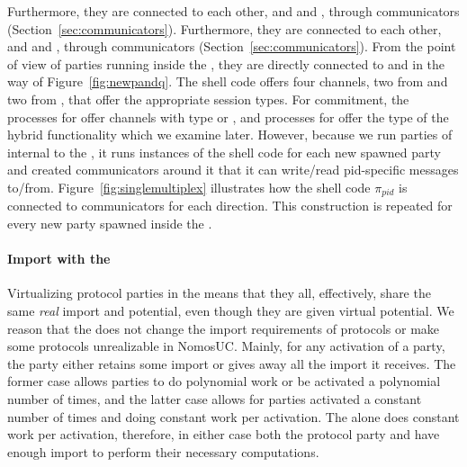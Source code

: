 Furthermore, they are connected to each other, and \Z and \A, through communicators (Section~\ref{sec:communicators}).
Furthermore, they are connected to each other, and \Z and \A, through communicators (Section~\ref{sec:communicators}).
From the point of view of parties running inside the \partywrapper, they are directly connected to \F and \Z in the way of Figure~\ref{fig:newpandq}.
The shell code offers four channels, two from \F and two from \Z, that offer the appropriate session types. 
For commitment, the processes for \Z offer channels with type  or , and processes for \F offer the type of the hybrid functionality \Fro which we examine later.
However, because we run parties of \PI internal to the \partywrapper, it runs instances of the shell code for each new spawned party and created communicators around it that it can write/read pid-specific messages to/from.
Figure~\ref{fig:singlemultiplex} illustrates how the shell code $\pi_{pid}$ is connected to communicators for each direction. This construction is repeated for every new party spawned inside the \partywrapper.

\paragraph{Import with the \partywrapper}
Virtualizing protocol parties in the \partywrapper means that they all, effectively, share the same \emph{real} import and potential, even though they are given virtual potential.
We reason that the \partywrapper does not change the import requirements of protocols or make some protocols unrealizable in NomosUC.
Mainly, for any activation of a party, the party either retains some import or gives away all the import it receives. 
The former case allows parties to do polynomial work or be activated a polynomial number of times, and the latter case allows for parties activated a constant number of times and doing constant work per activation.
The \partywrapper alone does constant work per activation, therefore, in either case both the protocol party and \partywrapper have enough import to perform their necessary computations.

